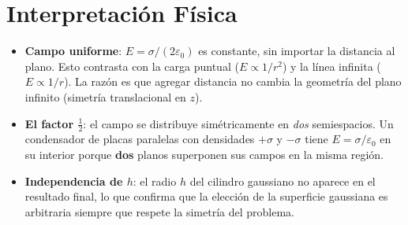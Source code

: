 \documentclass[12pt,letterpaper]{article}
\begin{document}
\section*{Interpretaci\'on F\'isica}

\begin{itemize}
    \item \textbf{Campo uniforme}: $E = \sigma/(2\varepsilon_0)$ es constante, sin importar
          la distancia al plano. Esto contrasta con la carga puntual
          ($E \propto 1/r^2$) y la l\'inea infinita ($E \propto 1/r$).
          La raz\'on es que agregar distancia no cambia la geometr\'ia del plano infinito
          (simetr\'ia translacional en $z$).

    \item \textbf{El factor $\tfrac{1}{2}$}: el campo se distribuye sim\'etricamente
          en \emph{dos} semiespacios.  Un condensador de placas paralelas con
          densidades $+\sigma$ y $-\sigma$ tiene $E = \sigma/\varepsilon_0$ en su interior
          porque \textbf{dos} planos superponen sus campos en la misma regi\'on.

    \item \textbf{Independencia de $h$}: el radio $h$ del cilindro gaussiano no aparece
          en el resultado final, lo que confirma que la elecci\'on de la superficie
          gaussiana es arbitraria siempre que respete la simetr\'ia del problema.
\end{itemize}
\end{document}
